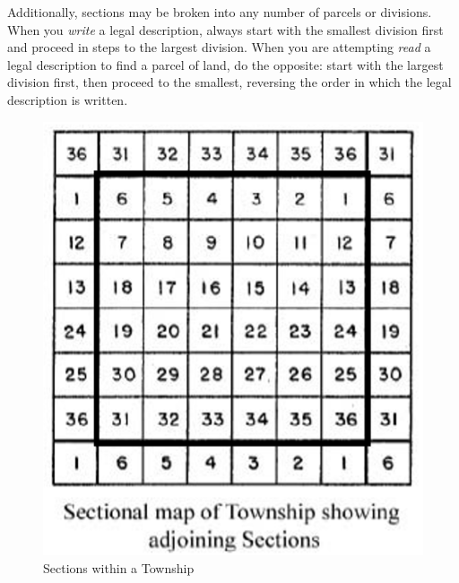 \documentclass[
  letterpaper,
  twocolumn,
  portrait]{scrbook}
\begin{document}
Additionally, sections may be broken into any number of parcels or
divisions. When you \emph{write} a legal description, always start with
the smallest division first and proceed in steps to the largest
division. When you are attempting \emph{read} a legal description to
find a parcel of land, do the opposite: start with the largest division
first, then proceed to the smallest, reversing the order in which the
legal description is written.

\begin{figure}

{\centering \includegraphics{sections-in-townships.png}

}

\caption{\label{fig-sections}Sections within a Township}

\end{figure}
\end{document}
